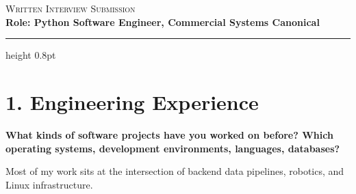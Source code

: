 \documentclass[letterpaper,11pt]{article}
\newcommand{\interviewQuestion}[1]{%
  \vspace{8pt}%
  \textbf{\color{airforceblue}#1}\par%
}
\begin{document}
\begin{center}
    {\huge\scshape Written Interview Submission} \\[8pt]
    {\large\textbf{\color{airforceblue}Role: Python Software Engineer, Commercial Systems \textbar{} Canonical}}
\end{center}

\vspace{4pt}
{\color{airforceblue}\hrule height 0.8pt}
\vspace{16pt}


\section*{1. Engineering Experience}

\interviewQuestion{What kinds of software projects have you worked on before? Which operating systems, development environments, languages, databases?}

Most of my work sits at the intersection of backend data pipelines, robotics, and Linux infrastructure.
\end{document}
